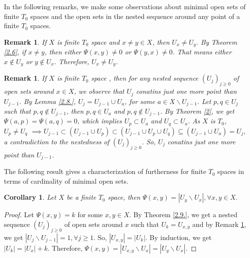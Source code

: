 \documentclass[12pt]{amsart}
\newtheorem{corollary}[definition]{Corollary}
\newtheorem{remark}[definition]{Remark}
\begin{document}
In the following remarks, we make some observations about minimal open sets of finite $T_0$ spaces and the open sets in the nested sequence around any point of a finite $T_0$ spaces.

\begin{remark}\label{2.13.}{\normalfont
	If $X$ is finite $T_0$ space and $x\neq y \in X$, then $U_x\neq U_y$. By Theorem \ref{2.6},  if $x\neq y$, then either $\Psi(x,y)\neq 0$ or $\Psi(y,x)\neq 0$. That means either $x\notin U_y$ or $y\notin U_x$. Therefore, $U_x\neq U_y$.
	 }
\end{remark}

	\begin{remark}\label{2.13..}{\normalfont
     If $X$ is finite $T_0$ space , then for any nested sequence $(U_j)_{j\geq 0}$ of open sets around $x\in X$, we observe that $U_j$ conatins just one more point than $U_{j-1}$. By Lemma \ref{2.8.}, $U_j= U_{j-1}\cup U_a$, for some $a\in X\backslash U_{j-1}$. Let $p,q\in U_j$ such that $p,q\notin U_{j-1}$, then $p,q\in U_a$ and $p,q\notin U_{j-1}$. By Theorem \ref{2}, we get $\Psi(a,p)=\Psi(a,q)=0$, which implies $U_p\subset U_a$ and $U_q\subset U_a$. As $X$ is $T_0$, $U_p\neq U_q$ $\implies U_{j-1}\subset (U_{j-1}\cup U_{p}) \subset (U_{j-1}\cup U_{p} \cup U_q) \subseteq (U_{j-1}\cup U_a) = U_j,$ a contradiction to the nestedness of $(U_j)_{j\geq0}$. So, $U_j$ conatins just one more point than $U_{j-1}$.
}
\end{remark}

 The following result gives a characterization of furtherness for finite $T_0$ spaces in terms of cardinality of minimal open sets.
 
 \begin{corollary}\label{2.14}
 	Let $X$ be a finite $T_0$ space, then $\Psi(x,y)=|U_y\backslash U_x|, \forall x,y\in X.$
 \end{corollary}
 \begin{proof}
   Let $\Psi(x,y)=k$ for some $x,y\in X$. By Theorem \ref{2.9.}, we get a nested sequence $(U_j)_{j\geq 0}$ of open sets around $x$ such that $U_k=U_{x,y}$ and by Remark \ref{2.13..}, we get $|U_j\backslash U_{j-1}|=1, \forall j\geq 1.$ So, $|U_{x,y}|=|U_k|$. By induction, we get $|U_{k}|=|U_{x}|+k.$ Therefore, $\Psi(x,y)=|U_{x,y}\backslash U_{x}|= |U_y\backslash U_x|.$ 
 \end{proof}
\end{document}
